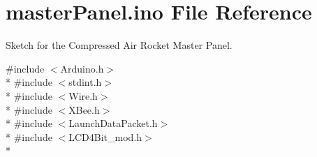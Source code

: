 \hypertarget{masterPanel_8ino}{}\section{master\+Panel.\+ino File Reference}
\label{masterPanel_8ino}


Sketch for the Compressed Air Rocket Master Panel.  


{\ttfamily \#include $<$Arduino.\+h$>$}\\*
{\ttfamily \#include $<$stdint.\+h$>$}\\*
{\ttfamily \#include $<$Wire.\+h$>$}\\*
{\ttfamily \#include $<$X\+Bee.\+h$>$}\\*
{\ttfamily \#include $<$Launch\+Data\+Packet.\+h$>$}\\*
{\ttfamily \#include $<$L\+C\+D4\+Bit\+\_\+mod.\+h$>$}\\*
